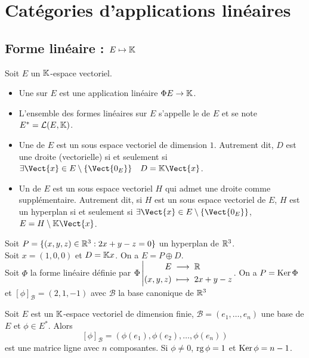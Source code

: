 \documentclass{book}
\begin{document}



\section{Catégories d'applications linéaires}
\subsection{Forme linéaire : $E\mapsto \mathbb{K} $}
\begin{Definition}

Soit $E$ un $\mathbb{K} $-espace vectoriel.
\begin{itemize}
\item
  Une  sur $E$ est une application linéaire $\Phi E\to \mathbb{K} $.
\item  L'ensemble des formes linéaires sur $E$ s'appelle le  de $E$  et se note $E^* = \mathcal{L}(E,\mathbb{K} )$.
\item
  Une  de $E$ est un sous espace vectoriel de dimension $1$.
  Autrement dit, $D$ est une droite (vectorielle) si et seulement si $\exists  \Vect{x}\in  E\setminus \{\Vect{0_E}\} \quad D =\K \Vect{x}$.
\item
  Un  de $E$ est un sous espace vectoriel $H$
  qui admet une droite comme supplémentaire.
  Autrement dit, si $H$ est un sous espace vectoriel de $E$,
  $H$ est un hyperplan si et seulement si  $\exists  \Vect{x}\in  E\setminus \{\Vect{0_E}\}$, $E = H\setminus \K \Vect{x}$.
\end{itemize}
\end{Definition}
\begin{Exemple}
Soit $P = \{(x,y,z)\in  \mathbb{R} ^3:2x+y-z=0\}$ un hyperplan de $\mathbb{R}^3$.\\
Soit $x = (1,0,0)$ et $D = \mathbb{K} x$. On a $E = P \oplus D$.\\
Soit $\Phi$ la forme linéaire définie par $ {\Phi }\left|\begin{aligned}{E}&\;\longrightarrow\;{\mathbb{R} }\\{(x,y,z)}&\;\longmapsto\;{2x+y-z}\end{aligned}\right.$. On a $P = \operatorname{Ker} \Phi $ et $[\phi]_{\mathcal{B}}=(2,1,-1)$ avec $\mathcal{B}$ la base canonique de $\mathbb{R} ^3$
\end{Exemple}
\begin{Proposition} 
Soit $E$ est un $\mathbb{K} $-espace vectoriel de dimension finie, $\mathcal{B}=(e_1,\dots,e_n)$ une base de $E$ et $\phi\in E^*$. Alors   $$[\phi]_{\mathcal{B}}=(\phi(e_1),\phi(e_2),\dots,\phi(e_n))$$ est une matrice ligne avec $n$ composantes. Si $\phi\neq 0$, $\operatorname{rg} \phi =1$ et $\operatorname{Ker} \phi =n-1$.
\end{Proposition}
\end{document}
